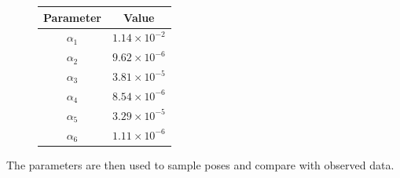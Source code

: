 \documentclass[paper=a4, fontsize=11pt]{scrartcl} %
\begin{document}
    \begin{figure}[h!]
        \centering
        \def\arraystretch{1.5}
        \begin{tabular}{|c|c|}
            \hline
            Parameter & Value \\
            \hline
            $\alpha_1$ & $1.14\times 10 ^{-2}$ \\
            $\alpha_2$ & $9.62\times 10 ^{-6}$ \\
            $\alpha_3$ & $3.81\times 10 ^{-5}$ \\
            $\alpha_4$ & $8.54\times 10 ^{-6}$ \\
            $\alpha_5$ & $3.29\times 10 ^{-5}$ \\
            $\alpha_6$ & $1.11\times 10 ^{-6}$ \\
            \hline
        \end{tabular}
    \end{figure}

    The parameters are then used to sample poses and compare with observed data.
\end{document}
